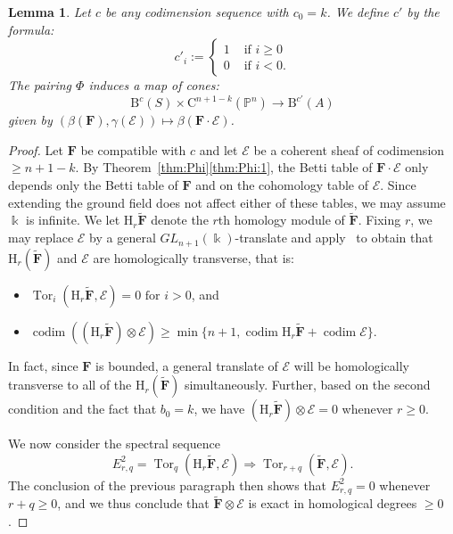 \documentclass[12pt]{amsart}
\newtheorem{lemma}{Lemma}[section]
\theoremstyle{definition}
\theoremstyle{remark}
\newcommand{\Tor}{\operatorname{Tor}}
\newcommand{\kk}{\Bbbk}
\newcommand{\codim}{\operatorname{codim}}
\newcommand{\PP}{\mathbb{P}}
\newcommand{\HH}{\mathrm{H}}
\newcommand{\cc}{c}
\newcommand{\cE}{\mathcal{E}}
\newcommand{\FF}{\mathbf{F}}
\newcommand{\GL}{{GL}}
\newcommand{\CQ}{\mathrm{C}}
\newcommand{\BBQ}{\mathrm{B}}
\begin{document}
\begin{lemma}\label{lem:refined positivity}
Let $\cc$ be any codimension sequence with $\cc_0=k$.   We define $\cc'$ by the formula:
\[
\cc'_i:=\begin{cases}
1&\text{ if } i\geq 0\\%
0&\text{ if } i<0. %
\end{cases}
\]
The  pairing $\Phi$ induces a map of cones:
\[
\BBQ^{\cc}(S)\times \CQ^{n+1-k}(\PP^n)\to \BBQ^{\cc'}(A)
\]
given by $(\beta(\FF), \gamma(\cE))\mapsto \beta(\FF\cdot \cE)$.
\end{lemma}
\begin{proof}
Let $\FF$ be compatible with $\cc$ and let $\cE$ be a coherent sheaf of codimension $\geq n+1-k$.  By Theorem~\ref{thm:Phi}\eqref{thm:Phi:1}, the Betti table of $\FF\cdot \cE$ only depends only the Betti table of $\FF$ and on the cohomology table of $\cE$.  Since extending the ground field does not affect either of these tables, we may assume $\kk$ is infinite.  We let $\HH_r \widetilde{\FF}$ denote the $r$th homology module of $\widetilde{\FF}$.  Fixing $r$, we may replace $\cE$ by a general $\GL_{n+1}(\kk)$-translate and apply~\cite[Theorem, p.\ 335]{miller-speyer} to obtain that $\HH_r(\widetilde{\FF})$ and $\cE$ are homologically transverse, that is:
\begin{itemize}
	\item $\Tor_i(\HH_r\widetilde{\FF},\cE)=0 \text{ for } i>0$, and
	\item $\codim ((\HH_r\widetilde{\FF})\otimes \cE) \geq \min\{n+1, \codim \HH_r\widetilde{\FF}+\codim \cE\}.$
\end{itemize}
In fact, since $\FF$ is bounded, a general translate of $\cE$ will be homologically transverse to all of the $\HH_r(\widetilde{\FF})$ simultaneously.  Further, based on the second condition and the fact that $b_0=k$, we have $(\HH_r\widetilde{\FF})\otimes \cE=0$ whenever $r\geq 0$.


We now consider the spectral sequence
\[
E^2_{r,q}=\Tor_q(\HH_r\widetilde{\FF},\cE)\Rightarrow \Tor_{r+q}(\widetilde{\FF},\cE).
\]
The conclusion of the previous paragraph then shows that $E^2_{r,q}=0$ whenever $r+q\geq 0$, and we thus conclude that 
$\widetilde{\FF}\otimes \cE$ is exact in homological degrees $\geq 0$.


\end{proof}
\end{document}
